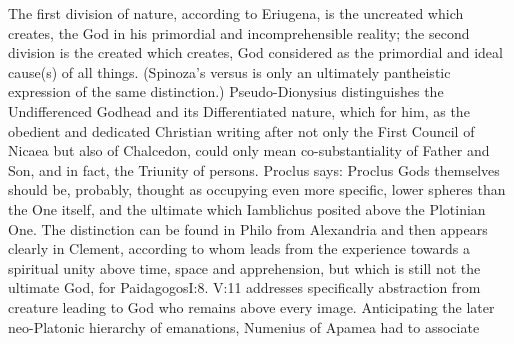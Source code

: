  The first division of nature,
according to Eriugena, is the uncreated which creates, the God in his primordial
and incomprehensible reality; the second division is the created which creates,
God considered as the primordial and ideal cause(s) of all things. (Spinoza's
 versus  is only an ultimately
pantheistic expression of the same distinction.)  Pseudo-Dionysius distinguishes
the Undifferenced Godhead and its Differentiated
nature, which for him, as the obedient and
dedicated Christian writing after not only the First Council of Nicaea but also
of Chalcedon, could only mean co-substantiality of Father and Son, and in fact,
the Triunity of persons. Proclus says: \citet{It is thanks to beings with which
  they are conjoined that all gods receive names, and hence thanks to these
  beings knowledge of various subsistences of these gods is possible, though in
  themselves they are unknowable.}{Proclus}{} Gods themselves should
be, probably, thought as occupying even more specific, lower spheres than the
One itself, and the ultimate  which Iamblichus posited
above the Plotinian One. The distinction can be found in Philo from
Alexandria  and
then appears clearly in Clement, according to whom  leads
from the experience towards a spiritual unity above time, space and
apprehension, but which is still not the ultimate God, for \citet{God is one,
  and beyond the one and above the Monad itself.}{Paidagogos}{I:8.  {V:11} addresses specifically
  abstraction from creature leading to God who remains above every image.}
  Anticipating the 
later neo-Platonic hierarchy of emanations, Numenius of Apamea had to associate
